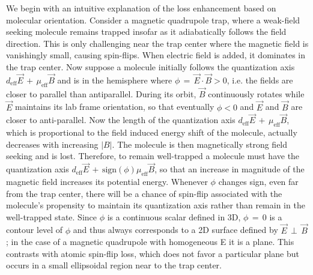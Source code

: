 \documentclass[%
 reprint,
 amsmath,amssymb,
 aps,
prl,
]{revtex4-1}
\newcommand{\epb}{{$\vec{E}\,{\perp}\,\vec{B}$}}
\begin{document}

We begin with an intuitive explanation of the loss enhancement based on molecular orientation.
Consider a magnetic quadrupole trap, where a weak-field seeking molecule remains trapped insofar as it adiabatically follows the field direction. 
This is only challenging near the trap center where the magnetic field is vanishingly small, causing spin-flips. 
When electric field is added, it dominates in the trap center. %
Now suppose a molecule initially follows the quantization axis $d_\text{eff}\vec{E}\,{+}\,\mu_\text{eff}\vec{B}$ and is in the hemisphere where $\phi\,{=}\,\vec{E}\cdot\vec{B}>0$, i.e. the fields are closer to parallel than antiparallel.
During its orbit, $\vec{B}$ continuously rotates while $\vec{E}$ maintains its lab frame orientation, so that eventually $\phi<0$ and $\vec{E}$ and $\vec{B}$ are closer to anti-parallel. 
Now the length of the quantization axis $d_\text{eff}\vec{E}\,{+}\,\mu_\text{eff}\vec{B}$, which is proportional to the field induced energy shift of the molecule, actually decreases with increasing $|B|$.
The molecule is then magnetically strong field seeking and is lost.
Therefore, to remain well-trapped a molecule must have the quantization axis $d_\text{eff}\vec{E}\,{+}\,\text{sign}(\phi)\mu_\text{eff}\vec{B}$, so that an increase in magnitude of the magnetic field increases its potential energy. 
Whenever $\phi$ changes sign, even far from the trap center, there will be a chance of spin-flip associated with the molecule's propensity to maintain its quantization axis rather than remain in the well-trapped state.
Since $\phi$ is a continuous scalar defined in 3D, $\phi\,{=}\,0$ is a contour level of $\phi$ and thus always corresponds to a 2D surface defined by \epb{}; in the case of a magnetic quadrupole with homogeneous E it is a plane.
This contrasts with atomic spin-flip loss, which does not favor a particular plane but occurs in a small ellipsoidal region near to the trap center.
\end{document}

